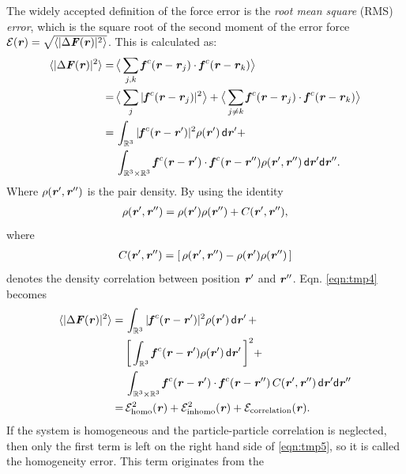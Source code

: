 \documentclass[aps, pre, preprint]{revtex4}
\renewcommand{\v}[1]{\textbf{\textit{#1}}}
\renewcommand{\d}[1]{\textsf{#1}}
\begin{document}
The widely accepted definition of the force error is the \emph{root
  mean square} (RMS) \emph{error}, which is the square root of the second
moment of the error force $\mathcal E(\v r) =
\sqrt{\langle\vert\Delta\v F(\v r)\vert^2\rangle}$. This is 
calculated as:
\begin{align} \nonumber
  \langle\vert\Delta\v F(\v r)\vert^2\rangle
  =\,&
  \big\langle\sum_{j,k}\v f^c(\v r - \v r_j)\cdot\v f^c(\v r - \v r_k)\big\rangle \\ \nonumber
  =\,&
  \big\langle\sum_j\vert\v f^c(\v r - \v r_j)\vert^2\big\rangle +
  \big\langle\sum_{j\neq k}\v f^c(\v r - \v r_j)\cdot\v f^c(\v r - \v r_k)\big\rangle \\ \nonumber
  =\,&
  \int_{\mathbb R^3}\vert\v f^c(\v r - \v r')\vert^2\rho(\v r')\,\d d\v r'
  + \\\label{eqn:tmp4}
  \,&
  \int_{\mathbb R^3\times\mathbb R^3}\v f^c(\v r - \v r')\cdot\v f^c(\v r - \v r'')\rho(\v r', \v r'')\,\d d\v r'\d d\v r''.
\end{align}
Where  $\rho(\v r', \v r'')$ is the pair density. By using the identity
\begin{align}  \label{eqn:tmp7}
  \rho(\v r', \v r'')
  = \rho(\v r')\rho(\v r'') + C (\v r', \v r''),
\end{align}
where 
\begin{align}
C (\v r', \v r'') = [\,\rho(\v r', \v r'') -  \rho(\v r')\rho(\v r'')\,]
\end{align}
denotes the density correlation between position $\v r'$ and $\v
r''$. Eqn. \eqref{eqn:tmp4} becomes
\begin{align} \nonumber
  \langle\vert\Delta\v F(\v r)\vert^2\rangle
  = &\,
  \int_{\mathbb R^3}\vert\v f^c(\v r - \v r')\vert^2\rho(\v r')\,\d d\v r' \,+ \\\nonumber
  &\,
  \bigg[\int_{\mathbb R^3}\v f^c(\v r - \v r')\rho(\v r')\,\d d\v r'\,\bigg]^2 + \\\nonumber
  &\,
  \int_{\mathbb R^3\times\mathbb R^3}\v f^c(\v r - \v r')\cdot\v f^c(\v r - \v r'')\,C(\v r', \v r'')\,\d d\v r'\d d\v r'' \\\label{eqn:tmp5}
  = &\,
  \mathcal E^2_{\textrm{homo}}(\v r) +
  \mathcal E^2_{\textrm{inhomo}}(\v r) +
  \mathcal E_{\textrm{correlation}}(\v r).
\end{align}
If the system is homogeneous and the particle-particle correlation is
neglected, then only the first term is left on the right hand side of \eqref{eqn:tmp5}, so it
is called the homogeneity error.  This term originates from the
\end{document}
